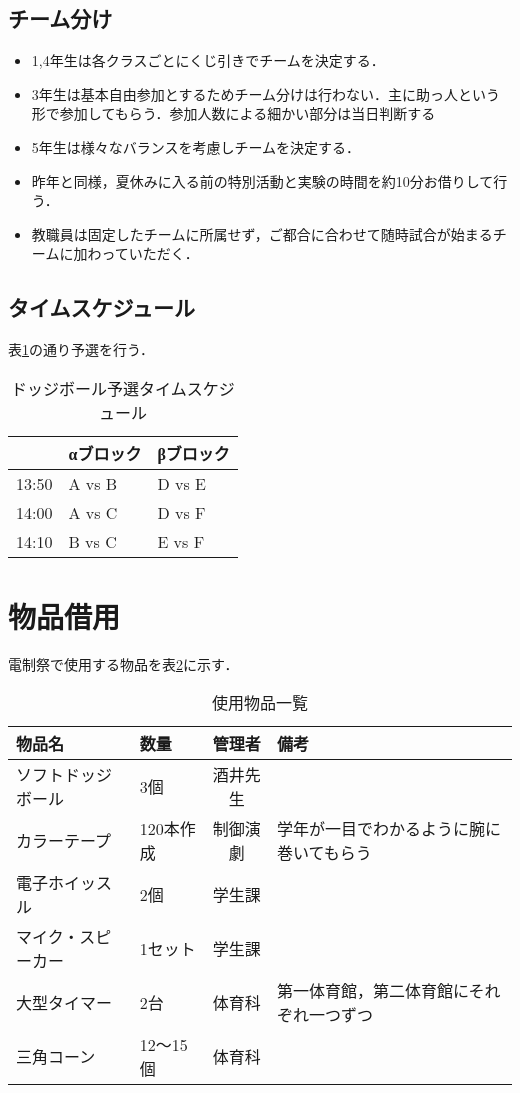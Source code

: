 \documentclass[dvipdfmx]{jsarticle}
\begin{document}
\subsection{チーム分け}\label{team}
\begin{itemize}
  \item 1,4年生は各クラスごとにくじ引きでチームを決定する．
  \item 3年生は基本自由参加とするためチーム分けは行わない．主に助っ人という形で参加してもらう．参加人数による細かい部分は当日判断する
  \item 5年生は様々なバランスを考慮しチームを決定する．
  \item 昨年と同様，夏休みに入る前の特別活動と実験の時間を約10分お借りして行う．
  \item 教職員は固定したチームに所属せず，ご都合に合わせて随時試合が始まるチームに加わっていただく．
\end{itemize}

\subsection{タイムスケジュール}
表\ref{block}の通り予選を行う．
\begin{table}[H]
  \caption{ドッジボール予選タイムスケジュール}
  \label{block}
  \centering
  \begin{tabular}{l|ll}
          & αブロック  & βブロック  \\\hline\hline
    13:50 & A vs B & D vs E \\
    14:00 & A vs C & D vs F \\
    14:10 & B vs C & E vs F
  \end{tabular}
\end{table}

\section{物品借用}
電制祭で使用する物品を表\ref{buppin}に示す．
\begin{table}[H]
  \caption{使用物品一覧}
  \label{buppin}
  \centering
  \begin{tabular}{l|lcl}
    物品名       & 数量     & 管理者  & 備考                   \\\hline\hline
    ソフトドッジボール & 3個     & 酒井先生 &                      \\
    カラーテープ    & 120本作成 & 制御演劇 & 学年が一目でわかるように腕に巻いてもらう \\
    電子ホイッスル   & 2個     & 学生課  &                      \\
    マイク・スピーカー & 1セット   & 学生課  &                      \\
    大型タイマー    & 2台     & 体育科  & 第一体育館，第二体育館にそれぞれ一つずつ \\
    三角コーン     & 12～15個 & 体育科  &
  \end{tabular}
\end{table}
\end{document}

